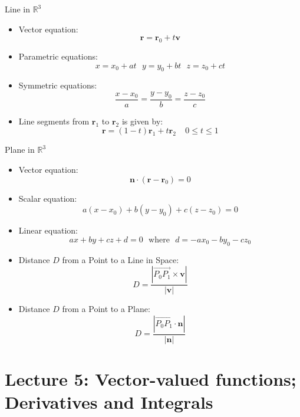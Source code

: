 \documentclass[10pt]{beamer}
\begin{document}
\begin{frame}[allowframebreaks]{Line in $\mathbb{R}^3$}
	
\begin{itemize}
	\item Vector equation:
	$$\mathbf{r} = \mathbf{r}_0 + t\mathbf{v}$$
	
	\item Parametric equations:
	$$x = x_0 + at ~~~ y = y_0 + bt ~~~ z = z_0 + ct$$
	
	\item Symmetric equations:
	$$\dfrac{x- x_0}{a} = \dfrac{y - y_0}{b} = \dfrac{z - z_0 }{c}$$
	
	\item Line segments from $\mathbf{r}_1$ to $\mathbf{r}_2$ is given by:
	$$\mathbf{r} = (1-t)\mathbf{r}_1 + t\mathbf{r}_2~~~~~0\leq t\leq 1$$

\end{itemize}

\end{frame}



\begin{frame}[allowframebreaks]{Plane in $\mathbb{R}^3$}

	\begin{itemize}
		\item Vector equation:
		$$\mathbf{n}\cdot(\mathbf{r}- \mathbf{r}_0) = 0$$
		
		\item Scalar equation:
		$$a(x - x_0) + b(y - y_0) + c(z - z_0) = 0$$
		
		\item Linear equation:
		$$ax + by + cz + d = 0 ~~~ \text{where} ~~~ d = -ax_0 - by_0 - cz_0$$
		
		\item Distance $D$ from a Point to a Line in Space:
		$$D = \dfrac{\left\vert\overrightarrow{P_0P_1}\times \mathbf{v}\right\vert}{|\mathbf{v}|}$$
		
		\item Distance $D$ from a Point to a Plane:
		$$D = \dfrac{\left\vert\overrightarrow{P_0P_1}\cdot\mathbf{n}\right\vert}{|\mathbf{n}|}$$
		
	\end{itemize}

\end{frame}







\section{Lecture 5: Vector-valued functions; Derivatives and Integrals}
\end{document}
